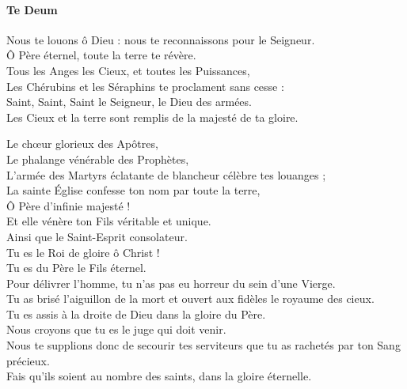 \documentclass[twoside]{article}
\begin{document}
\begin{paracol}[1]{2}

\switchcolumn

\paragraph{Te Deum}
\vfill
Nous te louons ô Dieu : nous te reconnaissons pour le Seigneur.\\
Ô Père éternel, toute la terre te révère.\\
Tous les Anges les Cieux, et toutes les Puissances,\\
Les Chérubins et les Séraphins te proclament sans cesse :\\

Saint, Saint, Saint le Seigneur, le Dieu des armées.\\
Les Cieux et la terre sont remplis de la majesté de ta gloire.\\

\vfill
\newpage
\null\vfill

Le chœur glorieux des Apôtres,\\
Le phalange vénérable des Prophètes,\\
L'armée des Martyrs éclatante de blancheur célèbre tes louanges ;\\

La sainte Église confesse ton nom par toute la terre,\\
Ô Père d'infinie majesté !\\
Et elle vénère ton Fils véritable et unique.\\
Ainsi que le Saint-Esprit consolateur.\\
Tu es le Roi de gloire ô Christ !\\
Tu es du Père le Fils éternel.\\

Pour délivrer l'homme, tu n'as pas eu horreur du sein d'une Vierge.\\

Tu as brisé l'aiguillon de la mort et ouvert aux fidèles le royaume des cieux.\\


\vfill
\newpage
\null\vfill
Tu es assis à la droite de Dieu dans la gloire du Père.\\
Nous croyons que tu es le juge qui doit venir.\\

Nous te supplions donc de secourir tes serviteurs que tu as rachetés par ton Sang précieux.\\
Fais qu'ils soient au nombre des saints, dans la gloire éternelle.\\


\end{paracol}
\end{document}
